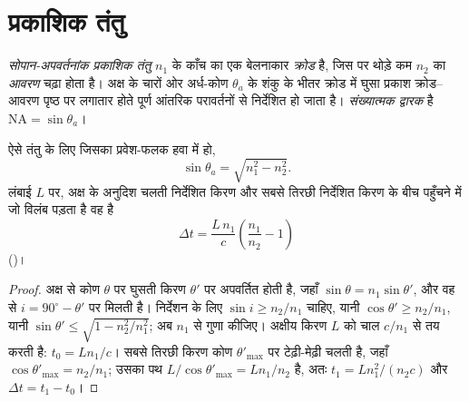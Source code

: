 \section{प्रकाशिक तंतु}

\begin{definition}[सोपान-अपवर्तनांक तंतु]\label{def:b1:rays-reflection-refraction:fiber}
\emph{सोपान-अपवर्तनांक प्रकाशिक तंतु}  $n_1$ के काँच का एक बेलनाकार
\emph{क्रोड} है, जिस पर थोड़े कम  $n_2$ का \emph{आवरण} चढ़ा होता
है। अक्ष के चारों ओर अर्ध-कोण $\theta_a$ के शंकु के भीतर क्रोड में घुसा
प्रकाश क्रोड--आवरण पृष्ठ पर लगातार होते पूर्ण आंतरिक परावर्तनों से निर्देशित
हो जाता है। \emph{संख्यात्मक द्वारक} है
$\mathrm{NA} = \sin\theta_a$।
\end{definition}

\begin{proposition}[ग्राह्यता शंकु और अंतरमोड प्रसार]\label{prop:b1:rays-reflection-refraction:fiber}
ऐसे तंतु के लिए जिसका प्रवेश-फलक हवा में हो,
\[
\sin\theta_a = \sqrt{n_1^2 - n_2^2} .
\]
लंबाई $L$ पर, अक्ष के अनुदिश चलती निर्देशित किरण और सबसे तिरछी निर्देशित किरण
के बीच पहुँचने में जो विलंब पड़ता है वह है
\[
\Delta t = \frac{L\,n_1}{c}\left(\frac{n_1}{n_2} - 1\right)
\]
(\emph{})।
\end{proposition}

\begin{proof}
अक्ष से कोण $\theta$ पर घुसती किरण $\theta'$ पर अपवर्तित होती है, जहाँ
$\sin\theta = n_1\sin\theta'$, और वह  से 
$i = 90^\circ - \theta'$ पर मिलती है। निर्देशन के लिए
$\sin i \geq n_2/n_1$ चाहिए, यानी $\cos\theta' \geq n_2/n_1$, यानी
$\sin\theta' \leq
\sqrt{1 - n_2^2/n_1^2}$; अब $n_1$ से गुणा कीजिए। अक्षीय
किरण $L$ को चाल $c/n_1$ से तय करती है: $t_0 = Ln_1/c$। सबसे तिरछी किरण कोण
$\theta'_{\max}$ पर टेढ़ी-मेढ़ी चलती है, जहाँ
$\cos\theta'_{\max} = n_2/n_1$; उसका पथ
$L/\cos\theta'_{\max} = L n_1/n_2$ है, अतः $t_1 = L n_1^2/(n_2 c)$ और
$\Delta t = t_1 - t_0$।
\end{proof}

